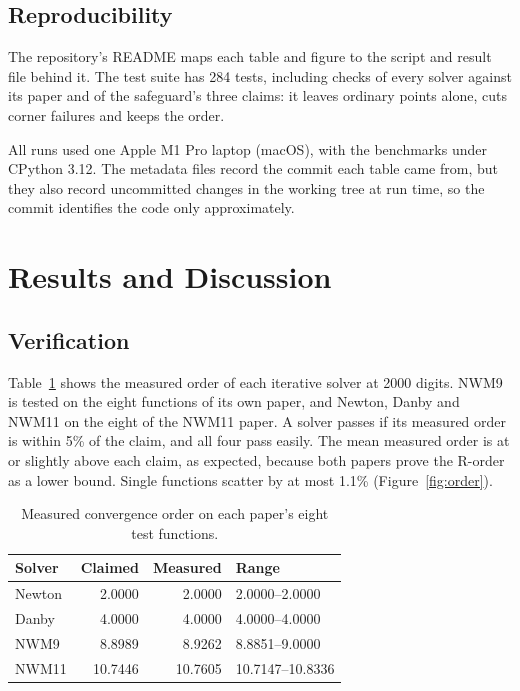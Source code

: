 \documentclass[sigconf,nonacm]{acmart}
\begin{document}
\subsection{Reproducibility}

The repository's README maps each table and figure to the script
and result file behind it. The test suite has 284 tests, including checks
of every solver against its paper and of the safeguard's three claims: it leaves ordinary points alone, cuts
corner failures and keeps the order.

All runs used one Apple M1 Pro laptop (macOS), with the benchmarks under
CPython 3.12. The metadata files record the commit each table came from,
but they also record uncommitted changes in the working tree at run
time, so the commit identifies the code only approximately.

\section{Results and Discussion}

\subsection{Verification}
\label{sec:verify}

Table~\ref{tab:order} shows the measured order of each iterative solver at
2000 digits. NWM9 is tested on the eight functions of its own paper, and
Newton, Danby and NWM11 on the eight of the NWM11 paper. A solver passes if
its measured order is within 5\% of the claim, and all four pass easily.
The mean measured order is at or slightly above each claim, as expected,
because both papers prove the R-order as a lower bound. Single functions
scatter by at most 1.1\% (Figure~\ref{fig:order}).

\begin{table}[h]
\centering\small
\caption{Measured convergence order on each paper's eight test functions.}
\label{tab:order}
\begin{tabular}{@{}lrrl@{}}
\toprule
\textbf{Solver} & \textbf{Claimed} & \textbf{Measured} & \textbf{Range} \\
\midrule
Newton & 2.0000  & 2.0000  & 2.0000--2.0000 \\
Danby  & 4.0000  & 4.0000  & 4.0000--4.0000 \\
NWM9   & 8.8989  & 8.9262  & 8.8851--9.0000 \\
NWM11  & 10.7446 & 10.7605 & 10.7147--10.8336 \\
\bottomrule
\end{tabular}
\end{table}
\end{document}
